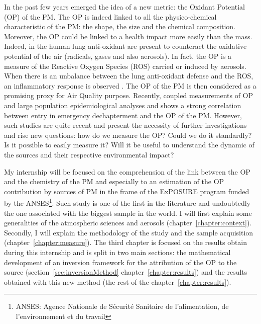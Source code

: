 \documentclass[a4paper,12pt]{memoir}
\begin{document}
In the past few years emerged the idea of a new metric: the Oxidant Potential (OP) of the
{PM}. The OP is indeed linked to all the physico-chemical characteristic of the PM: the
shape, the size and the chemical composition.  Moreover, the OP could be linked to a
health impact more easily than the mass.  Indeed, in the human lung anti-oxidant are
present to counteract the oxidative potential of the air (radicals, gases and also
aerosols).  In fact, the OP is a measure of the Reactive Oxygen Species (ROS) carried or
induced by aerosols. When there is an unbalance between the lung anti-oxidant defense and
the ROS, an inflammatory response is observed
\citep{donaldson_oxidative_2003,delfino_potential_2005,li_adjuvant_2009}.  The OP of the
PM is then considered as a promising proxy for Air Quality purpose.  Recently,
\citet{fang_oxidative_2016} coupled measurements of OP and large population
epidemiological analyses and shows a strong correlation between entry in emergency
dechapterment and the OP of the {PM}.
However, such studies are quite recent and present the necessity of further investigations
and rise new questions: how do we measure the {OP}? Could we do it standardly?  Is it
possible to easily measure it?  Will it be useful to understand the dynamic of the sources
and their respective environmental impact?


My internship will be focused on the comprehension of the link between the OP and the
chemistry of the PM and especially to an estimation of the OP contribution by sources of
{PM} in the frame of the ExPOSURE program funded by the ANSES\footnote{ANSES: Agence
    Nationale de Sécurité Sanitaire de l'alimentation, de l'environnement et du travail}.
    Such study is one of the first in the literature and undoubtedly the one associated
    with the biggest sample in the world.  I will first explain some generalities of the
    atmospheric sciences and aerosols (chapter~\ref{chapter:context}). Secondly, I will explain
    the methodology of the study and the sample acquisition (chapter~\ref{chapter:measure}).
    The third chapter is focused on the results obtain during this internship and is split in
    two main sections: the mathematical development of an inversion framework for the
    attribution of the OP to the source (section~\ref{sec:inversionMethod}
    chapter~\ref{chapter:results}) and the results obtained with this new method (the rest of
    the chapter~\ref{chapter:results}).
\end{document}
